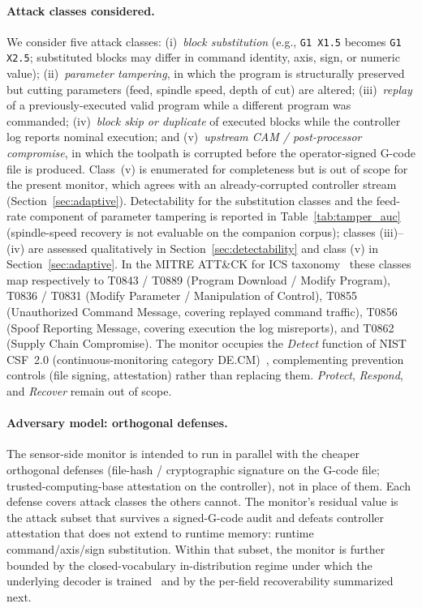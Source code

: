 \documentclass[sensors,article,submit,moreauthors,pdftex]{Definitions/mdpi}
\begin{document}
\paragraph{Attack classes considered.} We consider five attack classes: (i)~\emph{block substitution} (e.g., \texttt{G1 X1.5} becomes \texttt{G1 X2.5}; substituted blocks may differ in command identity, axis, sign, or numeric value); (ii)~\emph{parameter tampering}, in which the program is structurally preserved but cutting parameters (feed, spindle speed, depth of cut) are altered; (iii)~\emph{replay} of a previously-executed valid program while a different program was commanded; (iv)~\emph{block skip or duplicate} of executed blocks while the controller log reports nominal execution; and (v)~\emph{upstream CAM / post-processor compromise}, in which the toolpath is corrupted before the operator-signed G-code file is produced. Class~(v) is enumerated for completeness but is out of scope for the present monitor, which agrees with an already-corrupted controller stream (Section~\ref{sec:adaptive}). Detectability for the substitution classes and the feed-rate component of parameter tampering is reported in Table~\ref{tab:tamper_auc} (spindle-speed recovery is not evaluable on the companion corpus); classes (iii)--(iv) are assessed qualitatively in Section~\ref{sec:detectability} and class (v) in Section~\ref{sec:adaptive}. In the MITRE ATT\&CK for ICS taxonomy~\cite{mitre_attack_ics} these classes map respectively to T0843 / T0889 (Program Download / Modify Program), T0836 / T0831 (Modify Parameter / Manipulation of Control), T0855 (Unauthorized Command Message, covering replayed command traffic), T0856 (Spoof Reporting Message, covering execution the log misreports), and T0862 (Supply Chain Compromise). The monitor occupies the \emph{Detect} function of NIST CSF~2.0 (continuous-monitoring category DE.CM)~\cite{nistcsf2}, complementing prevention controls (file signing, attestation) rather than replacing them. \emph{Protect}, \emph{Respond}, and \emph{Recover} remain out of scope.

\paragraph{Adversary model: orthogonal defenses.} The sensor-side monitor is intended to run in parallel with the cheaper orthogonal defenses (file-hash / cryptographic signature on the G-code file; trusted-computing-base attestation on the controller), not in place of them. Each defense covers attack classes the others cannot. The monitor's residual value is the attack subset that survives a signed-G-code audit and defeats controller attestation that does not extend to runtime memory: runtime command/axis/sign substitution. Within that subset, the monitor is further bounded by the closed-vocabulary in-distribution regime under which the underlying decoder is trained~\cite{decoder_paper} and by the per-field recoverability summarized next.
\end{document}
